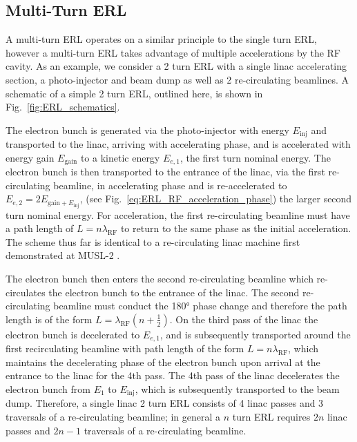 \documentclass[../main.tex]{subfiles}
\begin{document}
\subsection{Multi-Turn ERL}

A multi-turn ERL operates on a similar principle to the single turn ERL, however a multi-turn ERL takes advantage of multiple accelerations by the RF cavity. As an example, we consider a 2 turn ERL with a single linac accelerating section, a photo-injector and beam dump as well as 2 re-circulating beamlines. A schematic of a simple 2 turn ERL, outlined here, is shown in Fig.~\ref{fig:ERL_schematics}.  

The electron bunch is generated via the photo-injector with energy $E_{\mathrm{inj}}$ and transported to the linac, arriving with accelerating phase, and is accelerated with energy gain $E_{\mathrm{gain}}$ to a kinetic energy $E_{e,1}$, the first turn nominal energy. The electron bunch is then transported to the entrance of the linac, via the first re-circulating beamline, in accelerating phase and is re-accelerated to $E_{e,2}=2E_{\mathrm{gain}+E_{\mathrm{inj}}}$, (see Fig.~\ref{eq:ERL_RF_acceleration_phase}) the larger second turn nominal energy. For acceleration, the first re-circulating beamline must have a path length of $L = n\lambda_{\mathrm{RF}}$ to return to the same phase as the initial acceleration. The scheme thus far is identical to a re-circulating linac machine first demonstrated at MUSL-2 \cite{axel1977status}.

The electron bunch then enters the second re-circulating beamline which re-circulates the electron bunch to the entrance of the linac. The second re-circulating beamline must conduct the 180\si{\degree} phase change and therefore the path length is of the form $L=\lambda_{\mathrm{RF}}\left(n+\frac{1}{2}\right)$. On the third pass of the linac the electron bunch is decelerated to $E_{e,1}$, and is subsequently transported around the first recirculating beamline with path length of the form $L=n\lambda_{\mathrm{RF}}$, which maintains the decelerating phase of the electron bunch upon arrival at the entrance to the linac for the 4th pass. The 4th pass of the linac decelerates the electron bunch from $E_{1}$ to $E_{\mathrm{inj}}$, which is subsequently transported to the beam dump. Therefore, a single linac 2 turn ERL consists of 4 linac passes and 3 traversals of a re-circulating beamline; in general a $n$ turn ERL requires $2n$ linac passes and $2n-1$ traversals of a re-circulating beamline.
\end{document}
